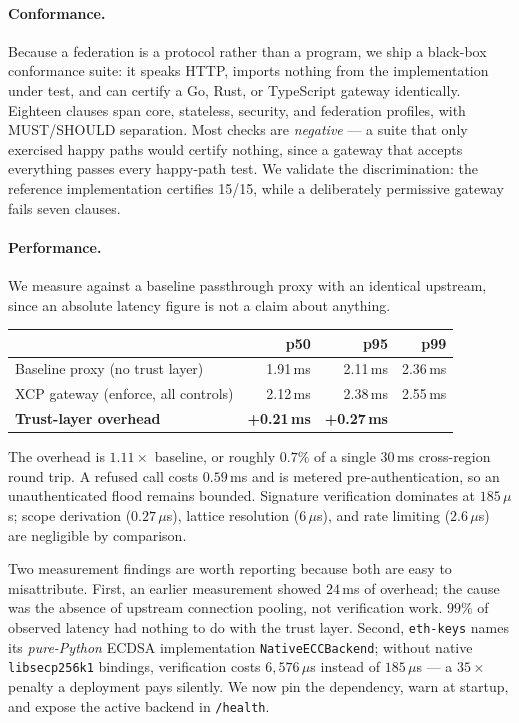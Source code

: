\documentclass[11pt]{article}
\begin{document}
\paragraph{Conformance.}
Because a federation is a protocol rather than a program, we ship a black-box
conformance suite: it speaks HTTP, imports nothing from the implementation under
test, and can certify a Go, Rust, or TypeScript gateway identically. Eighteen
clauses span core, stateless, security, and federation profiles, with MUST/SHOULD
separation. Most checks are \emph{negative} --- a suite that only exercised happy
paths would certify nothing, since a gateway that accepts everything passes every
happy-path test. We validate the discrimination: the reference implementation
certifies 15/15, while a deliberately permissive gateway fails seven clauses.

\paragraph{Performance.}
We measure against a baseline passthrough proxy with an identical upstream, since
an absolute latency figure is not a claim about anything.

\begin{center}
\small
\begin{tabular}{@{}lrrr@{}}
\toprule
& p50 & p95 & p99 \\
\midrule
Baseline proxy (no trust layer)        & 1.91\,ms & 2.11\,ms & 2.36\,ms \\
XCP gateway (enforce, all controls)    & 2.12\,ms & 2.38\,ms & 2.55\,ms \\
\textbf{Trust-layer overhead}          & \textbf{+0.21\,ms} & \textbf{+0.27\,ms} & \\
\bottomrule
\end{tabular}
\end{center}

The overhead is $1.11\times$ baseline, or roughly $0.7\%$ of a single $30$\,ms
cross-region round trip. A refused call costs $0.59$\,ms and is metered
pre-authentication, so an unauthenticated flood remains bounded. Signature
verification dominates at $185\,\mu$s; scope derivation ($0.27\,\mu$s), lattice
resolution ($6\,\mu$s), and rate limiting ($2.6\,\mu$s) are negligible by
comparison.

Two measurement findings are worth reporting because both are easy to
misattribute. First, an earlier measurement showed $24$\,ms of overhead; the
cause was the absence of upstream connection pooling, not verification work.
$99\%$ of observed latency had nothing to do with the trust layer. Second,
\texttt{eth-keys} names its \emph{pure-Python} ECDSA implementation
\texttt{NativeECCBackend}; without native \texttt{libsecp256k1} bindings,
verification costs $6{,}576\,\mu$s instead of $185\,\mu$s --- a $35\times$ penalty
a deployment pays silently. We now pin the dependency, warn at startup, and
expose the active backend in \texttt{/health}.
\end{document}
